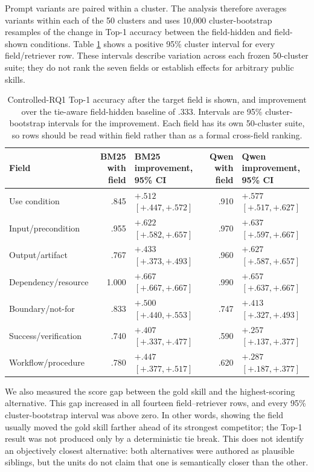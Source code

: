 Prompt variants are paired within a cluster. The analysis therefore averages variants within each of the 50 clusters and uses 10,000 cluster-bootstrap resamples of the change in Top-1 accuracy between the field-hidden and field-shown conditions. Table \ref{tab:rq1a-cluster-bootstrap} shows a positive 95\% cluster interval for every field/retriever row. These intervals describe variation across each frozen 50-cluster suite; they do not rank the seven fields or establish effects for arbitrary public skills.

\begin{table}[H]
\centering
\scriptsize
\setlength{\tabcolsep}{3pt}
\begin{tabular}{p{}rp{}rp{}}
\toprule
Field & BM25 with field & BM25 improvement, 95\% CI & Qwen with field & Qwen improvement, 95\% CI \\
\midrule
Use condition & .845 & $+.512$ $[+.447,+.572]$ & .910 & $+.577$ $[+.517,+.627]$ \\
Input/precondition & .955 & $+.622$ $[+.582,+.657]$ & .970 & $+.637$ $[+.597,+.667]$ \\
Output/artifact & .767 & $+.433$ $[+.373,+.493]$ & .960 & $+.627$ $[+.587,+.657]$ \\
Dependency/resource & 1.000 & $+.667$ $[+.667,+.667]$ & .990 & $+.657$ $[+.637,+.667]$ \\
Boundary/not-for & .833 & $+.500$ $[+.440,+.553]$ & .747 & $+.413$ $[+.327,+.493]$ \\
Success/verification & .740 & $+.407$ $[+.337,+.477]$ & .590 & $+.257$ $[+.137,+.377]$ \\
Workflow/procedure & .780 & $+.447$ $[+.377,+.517]$ & .620 & $+.287$ $[+.187,+.377]$ \\
\bottomrule
\end{tabular}
\caption{Controlled-RQ1 Top-1 accuracy after the target field is shown, and improvement over the tie-aware field-hidden baseline of .333. Intervals are 95\% cluster-bootstrap intervals for the improvement. Each field has its own 50-cluster suite, so rows should be read within field rather than as a formal cross-field ranking.}
\label{tab:rq1a-cluster-bootstrap}
\end{table}

We also measured the score gap between the gold skill and the highest-scoring alternative. This gap increased in all fourteen field--retriever rows, and every 95\% cluster-bootstrap interval was above zero. In other words, showing the field usually moved the gold skill farther ahead of its strongest competitor; the Top-1 result was not produced only by a deterministic tie break. This does not identify an objectively closest alternative: both alternatives were authored as plausible siblings, but the units do not claim that one is semantically closer than the other.

